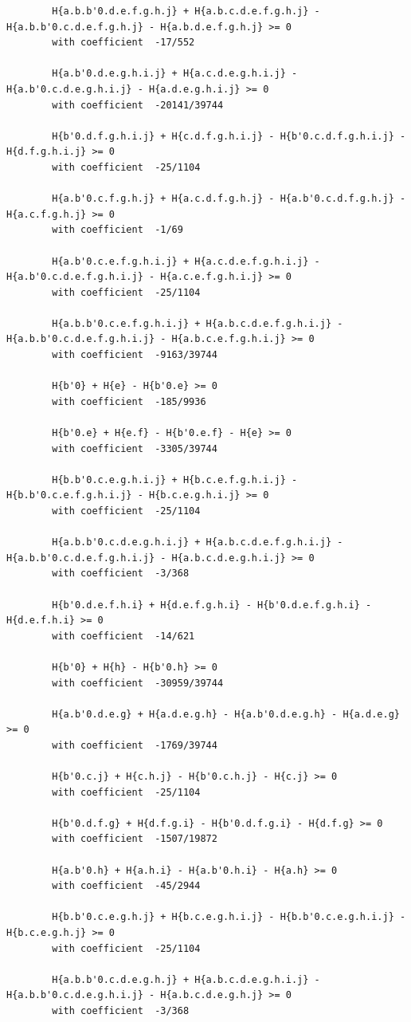\documentclass[11pt, a4paper]{kybernetika}
\begin{document}
\begin{verbatim}
		H{a.b.b'0.d.e.f.g.h.j} + H{a.b.c.d.e.f.g.h.j} - H{a.b.b'0.c.d.e.f.g.h.j} - H{a.b.d.e.f.g.h.j} >= 0
		with coefficient  -17/552
		
		H{a.b'0.d.e.g.h.i.j} + H{a.c.d.e.g.h.i.j} - H{a.b'0.c.d.e.g.h.i.j} - H{a.d.e.g.h.i.j} >= 0
		with coefficient  -20141/39744
		
		H{b'0.d.f.g.h.i.j} + H{c.d.f.g.h.i.j} - H{b'0.c.d.f.g.h.i.j} - H{d.f.g.h.i.j} >= 0
		with coefficient  -25/1104
		
		H{a.b'0.c.f.g.h.j} + H{a.c.d.f.g.h.j} - H{a.b'0.c.d.f.g.h.j} - H{a.c.f.g.h.j} >= 0
		with coefficient  -1/69
		
		H{a.b'0.c.e.f.g.h.i.j} + H{a.c.d.e.f.g.h.i.j} - H{a.b'0.c.d.e.f.g.h.i.j} - H{a.c.e.f.g.h.i.j} >= 0
		with coefficient  -25/1104
		
		H{a.b.b'0.c.e.f.g.h.i.j} + H{a.b.c.d.e.f.g.h.i.j} - H{a.b.b'0.c.d.e.f.g.h.i.j} - H{a.b.c.e.f.g.h.i.j} >= 0
		with coefficient  -9163/39744
		
		H{b'0} + H{e} - H{b'0.e} >= 0
		with coefficient  -185/9936
		
		H{b'0.e} + H{e.f} - H{b'0.e.f} - H{e} >= 0
		with coefficient  -3305/39744
		
		H{b.b'0.c.e.g.h.i.j} + H{b.c.e.f.g.h.i.j} - H{b.b'0.c.e.f.g.h.i.j} - H{b.c.e.g.h.i.j} >= 0
		with coefficient  -25/1104
		
		H{a.b.b'0.c.d.e.g.h.i.j} + H{a.b.c.d.e.f.g.h.i.j} - H{a.b.b'0.c.d.e.f.g.h.i.j} - H{a.b.c.d.e.g.h.i.j} >= 0
		with coefficient  -3/368
		
		H{b'0.d.e.f.h.i} + H{d.e.f.g.h.i} - H{b'0.d.e.f.g.h.i} - H{d.e.f.h.i} >= 0
		with coefficient  -14/621
		
		H{b'0} + H{h} - H{b'0.h} >= 0
		with coefficient  -30959/39744
		
		H{a.b'0.d.e.g} + H{a.d.e.g.h} - H{a.b'0.d.e.g.h} - H{a.d.e.g} >= 0
		with coefficient  -1769/39744
		
		H{b'0.c.j} + H{c.h.j} - H{b'0.c.h.j} - H{c.j} >= 0
		with coefficient  -25/1104
		
		H{b'0.d.f.g} + H{d.f.g.i} - H{b'0.d.f.g.i} - H{d.f.g} >= 0
		with coefficient  -1507/19872
		
		H{a.b'0.h} + H{a.h.i} - H{a.b'0.h.i} - H{a.h} >= 0
		with coefficient  -45/2944
		
		H{b.b'0.c.e.g.h.j} + H{b.c.e.g.h.i.j} - H{b.b'0.c.e.g.h.i.j} - H{b.c.e.g.h.j} >= 0
		with coefficient  -25/1104
		
		H{a.b.b'0.c.d.e.g.h.j} + H{a.b.c.d.e.g.h.i.j} - H{a.b.b'0.c.d.e.g.h.i.j} - H{a.b.c.d.e.g.h.j} >= 0
		with coefficient  -3/368
		

\end{verbatim}
\end{document}

